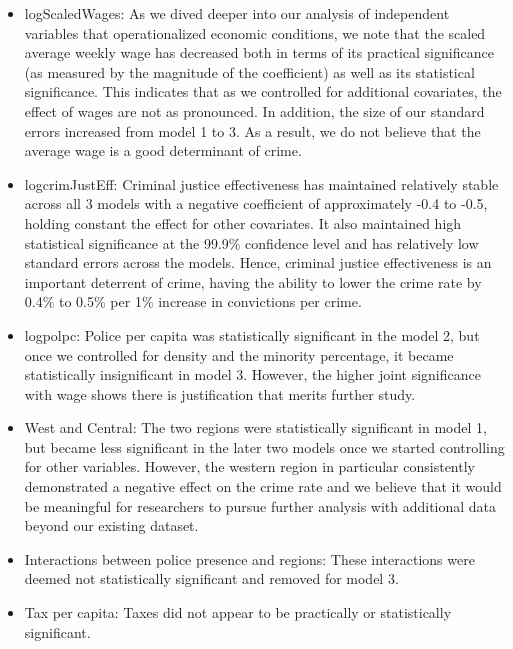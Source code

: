 \documentclass[]{article}
\providecommand{\tightlist}{%
  \setlength{\itemsep}{0pt}\setlength{\parskip}{0pt}}
\begin{document}
\begin{itemize}
\tightlist
\item
  logScaledWages: As we dived deeper into our analysis of independent
  variables that operationalized economic conditions, we note that the
  scaled average weekly wage has decreased both in terms of its
  practical significance (as measured by the magnitude of the
  coefficient) as well as its statistical significance. This indicates
  that as we controlled for additional covariates, the effect of wages
  are not as pronounced. In addition, the size of our standard errors
  increased from model 1 to 3. As a result, we do not believe that the
  average wage is a good determinant of crime.\\
\item
  logcrimJustEff: Criminal justice effectiveness has maintained
  relatively stable across all 3 models with a negative coefficient of
  approximately -0.4 to -0.5, holding constant the effect for other
  covariates. It also maintained high statistical significance at the
  99.9\% confidence level and has relatively low standard errors across
  the models. Hence, criminal justice effectiveness is an important
  deterrent of crime, having the ability to lower the crime rate by
  0.4\% to 0.5\% per 1\% increase in convictions per crime.\\
\item
  logpolpc: Police per capita was statistically significant in the model
  2, but once we controlled for density and the minority percentage, it
  became statistically insignificant in model 3. However, the higher
  joint significance with wage shows there is justification that merits
  further study.
\item
  West and Central: The two regions were statistically significant in
  model 1, but became less significant in the later two models once we
  started controlling for other variables. However, the western region
  in particular consistently demonstrated a negative effect on the crime
  rate and we believe that it would be meaningful for researchers to
  pursue further analysis with additional data beyond our existing
  dataset.\\
\item
  Interactions between police presence and regions: These interactions
  were deemed not statistically significant and removed for model 3.\\
\item
  Tax per capita: Taxes did not appear to be practically or
  statistically significant.\\

\end{itemize}
\end{document}
